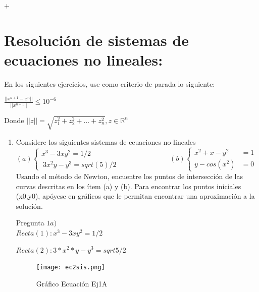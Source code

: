 +\documentclass{udpreport}
\begin{document}
\chapter{Resolución de sistemas de ecuaciones no lineales:}
    
        
        En los siguientes ejercicios, use como criterio de parada lo siguiente:
        \begin{center}
            $ \frac{|| x^{n+1} - x^{n} ||}{|| x^{n+1} ||} \leq 10^{-6} $  
        \end{center}
        

        Donde $||z||=\sqrt{z_{1}^{2} + z_{2}^2+...+z_{n}^{2}} , z \in \mathbb{R}^{n}$
    \begin{enumerate}   
        
        \item Considere los siguientes sistemas de ecuaciones no lineales\\
        
        \begin{math}
            (a)\left\lbrace
          \begin{array}{ll}
               x^3 - 3xy^2=1/2 \\\
                3x^2y-y^3 = sqrt(5)/2
            \end{array}
            \right.
            \hspace{3cm}
            (b) \left\lbrace
           \begin{array}{ll}
                 x^2+x-y^2&=1  \\
                 y-cos(x^2)&=0 
            \end{array}
            \right.
        \end{math}\\
        
        Usando el método de Newton, encuentre los puntos de intersección de las curvas descritas en los ítem (a) y (b). Para encontrar los puntos iniciales (x0,y0), apóyese en gráficos que le permitan encontrar una aproximación a la solución.
        
        
        Pregunta $ 1a) $\\
        
            
            $ Recta(1) : x^3 - 3xy^2=1/2 $
            
            $ Recta(2) : 3*x^2*y-y^3 = sqrt5/2 $
            
            \begin{figure}[h]
                \centering
                \texttt{[image: ec2sis.png]}
                 \caption{Gráfico Ecuación Ej1A}
            \end{figure}
            

\end{enumerate}
\end{document}
